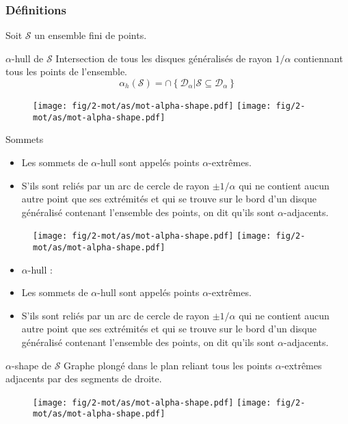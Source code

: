 \begin{frame}
\frametitle{Définitions}
{ Soit $\mathcal{S}$ un ensemble fini de points.
  \begin{block}{$\alpha$-hull de $\mathcal{S}$}
    Intersection de tous les disques généralisés de rayon $1/\alpha$ contiennant tous les points de l'ensemble.
    $$ \alpha_h(\mathcal{S}) = \cap \left\{ \mathcal{D}_{\alpha} | \mathcal{S} \subseteq \mathcal{D}_{\alpha} \right\}$$
    \begin{figure}[H]
      \centering
      \texttt{[image: fig/2-mot/as/mot-alpha-shape.pdf]}
      \texttt{[image: fig/2-mot/as/mot-alpha-shape.pdf]}
    \end{figure} 
  \end{block}

  \begin{block}{Sommets}
    \begin{itemize}
      \item Les sommets de $\alpha$-hull sont appelés points $\alpha$-extrêmes.
      \item S'ils sont reliés par un arc de cercle de rayon $\pm 1/ \alpha$ qui ne contient aucun autre point que ses extrémités et qui se trouve sur le bord d'un disque généralisé contenant l'ensemble des points, on dit qu'ils sont $\alpha$-adjacents.
    \end{itemize}
  \end{block}
}
{
  \begin{block}{}
    \vspace{-0.2cm}
    \begin{figure}[H]
      \centering
      \texttt{[image: fig/2-mot/as/mot-alpha-shape.pdf]}
      \texttt{[image: fig/2-mot/as/mot-alpha-shape.pdf]}
    \end{figure} 
    \vspace{-1cm}
    \begin{itemize}
      \item $\alpha$-hull :
      \item Les sommets de $\alpha$-hull sont appelés points $\alpha$-extrêmes.
      \item S'ils sont reliés par un arc de cercle de rayon $\pm 1/ \alpha$ qui ne contient aucun autre point que ses extrémités et qui se trouve sur le bord d'un disque généralisé contenant l'ensemble des points, on dit qu'ils sont $\alpha$-adjacents.
    \end{itemize}
  \end{block}


  \begin{block}{$\alpha$-shape de $\mathcal{S}$}
        Graphe plongé dans le plan reliant tous les points $\alpha$-extrêmes adjacents par des segments de droite.
    \begin{figure}[H]
      \centering
      \texttt{[image: fig/2-mot/as/mot-alpha-shape.pdf]}
      \texttt{[image: fig/2-mot/as/mot-alpha-shape.pdf]}
    \end{figure}
  \end{block}
}
\end{frame}

